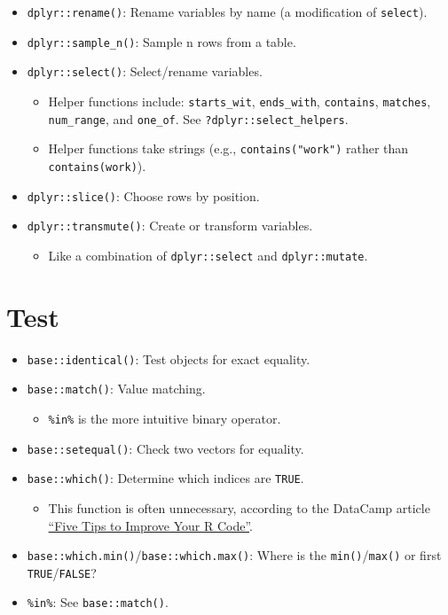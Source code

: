 \documentclass[
]{book}
\providecommand{\tightlist}{%
  \setlength{\itemsep}{0pt}\setlength{\parskip}{0pt}}
\begin{document}
\begin{itemize}
\tightlist
\item
  \texttt{dplyr::rename()}: Rename variables by name (a modification of \texttt{select}).
\item
  \texttt{dplyr::sample\_n()}: Sample n rows from a table.
\item
  \texttt{dplyr::select()}: Select/rename variables.

  \begin{itemize}
  \tightlist
  \item
    Helper functions include: \texttt{starts\_wit}, \texttt{ends\_with}, \texttt{contains}, \texttt{matches}, \texttt{num\_range}, and \texttt{one\_of}. See \texttt{?dplyr::select\_helpers}.
  \item
    Helper functions take strings (e.g., \texttt{contains("work")} rather than \texttt{contains(work)}).
  \end{itemize}
\item
  \texttt{dplyr::slice()}: Choose rows by position.
\item
  \texttt{dplyr::transmute()}: Create or transform variables.

  \begin{itemize}
  \tightlist
  \item
    Like a combination of \texttt{dplyr::select} and \texttt{dplyr::mutate}.
  \end{itemize}
\end{itemize}

\hypertarget{test-1}{%
\section{Test}\label{test-1}}

\begin{itemize}
\tightlist
\item
  \texttt{base::identical()}: Test objects for exact equality.
\item
  \texttt{base::match()}: Value matching.

  \begin{itemize}
  \tightlist
  \item
    \texttt{\%in\%} is the more intuitive binary operator.
  \end{itemize}
\item
  \texttt{base::setequal()}: Check two vectors for equality.
\item
  \texttt{base::which()}: Determine which indices are \texttt{TRUE}.

  \begin{itemize}
  \tightlist
  \item
    This function is often unnecessary, according to the DataCamp article \href{https://www.datacamp.com/community/tutorials/five-tips-r-code-improve}{``Five Tips to Improve Your R Code''}.
  \end{itemize}
\item
  \texttt{base::which.min()}/\texttt{base::which.max()}: Where is the \texttt{min()}/\texttt{max()} or first \texttt{TRUE}/\texttt{FALSE}?
\item
  \texttt{\%in\%}: See \texttt{base::match()}.
\end{itemize}
\end{document}
